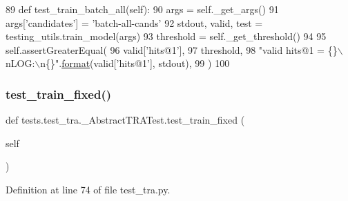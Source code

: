 \begin{DoxyCode}
89     \textcolor{keyword}{def }test\_train\_batch\_all(self):
90         args = self.\_get\_args()
91         args[\textcolor{stringliteral}{'candidates'}] = \textcolor{stringliteral}{'batch-all-cands'}
92         stdout, valid, test = testing\_utils.train\_model(args)
93         threshold = self.\_get\_threshold()
94 
95         self.assertGreaterEqual(
96             valid[\textcolor{stringliteral}{'hits@1'}],
97             threshold,
98             \textcolor{stringliteral}{"valid hits@1 = \{\}\(\backslash\)nLOG:\(\backslash\)n\{\}"}.\hyperlink{namespaceparlai_1_1chat__service_1_1services_1_1messenger_1_1shared__utils_a32e2e2022b824fbaf80c747160b52a76}{format}(valid[\textcolor{stringliteral}{'hits@1'}], stdout),
99         )
100 
\end{DoxyCode}
\mbox{\label{classtests_1_1test__tra_1_1__AbstractTRATest_a30a5312eaf7639e762ddbd410e31332c}} 
\subsubsection{\texorpdfstring{test\+\_\+train\+\_\+fixed()}{test\_train\_fixed()}}
{\footnotesize\ttfamily def tests.\+test\+\_\+tra.\+\_\+\+Abstract\+T\+R\+A\+Test.\+test\+\_\+train\+\_\+fixed (\begin{DoxyParamCaption}\item[{}]{self }\end{DoxyParamCaption})}



Definition at line 74 of file test\+\_\+tra.\+py.


